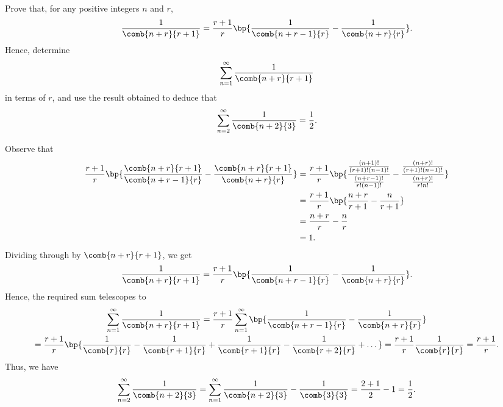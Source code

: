 \begin{problem}
    Prove that, for any positive integers $n$ and $r$, \[\frac{1}{\comb{n+r}{r+1}} = \frac{r+1}{r} \bp{\frac1{\comb{n+r-1}{r}} - \frac1{\comb{n+r}{r}}}.\] Hence, determine \[\sum_{n = 1}^\infty \frac1{\comb{n+r}{r+1}}\] in terms of $r$, and use the result obtained to deduce that \[\sum_{n = 2}^\infty \frac1{\comb{n+2}{3}} = \frac12.\]
\end{problem}
\begin{solution}
    Observe that
    \begin{align*}
        \frac{r+1}{r} \bp{\frac{\comb{n+r}{r+1}}{\comb{n+r-1}{r}} - \frac{\comb{n+r}{r+1}}{\comb{n+r}{r}}} &= \frac{r+1}{r} \bp{\frac{\frac{(n+1)!}{(r+1)!(n-1)!}}{\frac{(n+r-1)!}{r!(n-1)!}} - \frac{\frac{(n+r)!}{(r+1)!(n-1)!}}{\frac{(n+r)!}{r!n!}}}\\
        &= \frac{r+1}{r} \bp{\frac{n+r}{r+1} - \frac{n}{r+1}} \\
        &= \frac{n+r}{r} - \frac{n}{r}\\
        &= 1.
    \end{align*}
    Dividing through by $\comb{n+r}{r+1}$, we get \[\frac{1}{\comb{n+r}{r+1}} = \frac{r+1}{r} \bp{\frac1{\comb{n+r-1}{r}} - \frac1{\comb{n+r}{r}}}.\] Hence, the required sum telescopes to
    \begin{gather*}
        \sum_{n = 1}^\infty \frac1{\comb{n+r}{r+1}} = \frac{r+1}{r} \sum_{n = 1}^\infty \bp{\frac1{\comb{n+r-1}{r}} - \frac1{\comb{n+r}{r}}}\\
        = \frac{r+1}{r} \bp{\frac1{\comb{r}{r}} - \frac1{\comb{r+1}{r}} + \frac1{\comb{r+1}{r}} - \frac1{\comb{r+2}{r}} + \dots} = \frac{r+1}{r} \frac1{\comb{r}{r}} = \frac{r+1}{r}.
    \end{gather*}
    Thus, we have \[\sum_{n = 2}^\infty \frac1{\comb{n+2}{3}} = \sum_{n = 1}^\infty \frac1{\comb{n+2}{3}} - \frac1{\comb{3}{3}} = \frac{2+1}{2} - 1 = \frac12.\]
\end{solution}

